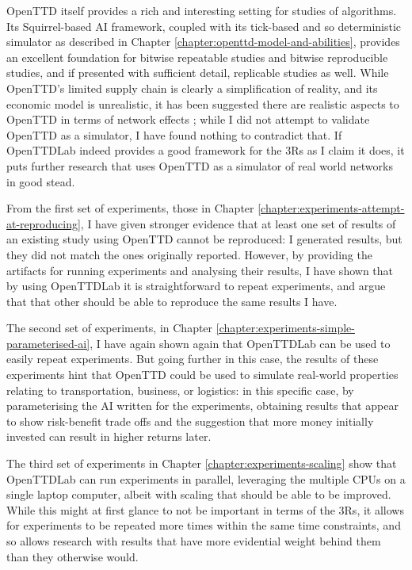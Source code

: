 \documentclass[logo,msc,dsti]{infthesis}    %
\begin{document}
{OpenTTD itself provides a rich and interesting setting for studies of algorithms. Its Squirrel-based AI framework, coupled with its tick-based and so deterministic simulator as described in Chapter \ref{chapter:openttd-model-and-abilities}, provides an excellent foundation for bitwise repeatable studies and bitwise reproducible studies, and if presented with sufficient detail, replicable studies as well. While OpenTTD's limited supply chain is clearly a simplification of reality, and its economic model is unrealistic, it has been suggested there are realistic aspects to OpenTTD in terms of network effects \cite{raghothama2013review}; while I did not attempt to validate OpenTTD as a simulator, I have found nothing to contradict that. If OpenTTDLab indeed provides a good framework for the 3Rs as I claim it does, it puts further research that uses OpenTTD as a simulator of real world networks in good stead.

From the first set of experiments, those in Chapter \ref{chapter:experiments-attempt-at-reproducing}, I have given stronger evidence that at least one set of results of an existing study using OpenTTD cannot be reproduced: I generated results, but they did not match the ones originally reported. However, by providing the artifacts for running experiments and analysing their results, I have shown that by using OpenTTDLab it is straightforward to repeat experiments, and argue that that other should be able to reproduce the same results I have.

The second set of experiments, in Chapter \ref{chapter:experiments-simple-parameterised-ai}, I have again shown again that OpenTTDLab can be used to easily repeat experiments. But going further in this case, the results of these experiments hint that OpenTTD could be used to simulate real-world properties relating to transportation, business, or logistics: in this specific case, by parameterising the AI written for the experiments, obtaining results that appear to show risk-benefit trade offs and the suggestion that more money initially invested can result in higher returns later.

The third set of experiments in Chapter \ref{chapter:experiments-scaling} show that OpenTTDLab can run experiments in parallel, leveraging the multiple CPUs on a single laptop computer, albeit with scaling that should be able to be improved. While this might at first glance to not be important in terms of the 3Rs, it allows for experiments to be repeated more times within the same time constraints, and so allows research with results that have more evidential weight behind them than they otherwise would.

}
\end{document}
